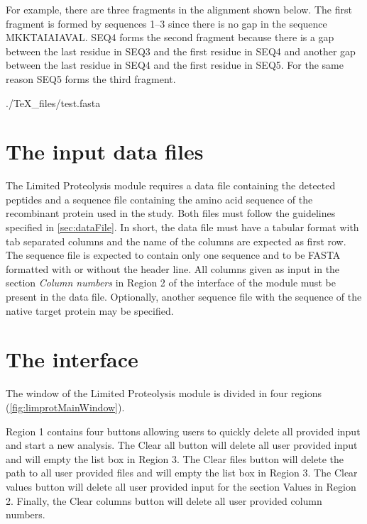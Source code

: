 For example, there are three fragments in the alignment shown below. The first fragment is formed by sequences \numrange{1}{3} since there is no gap in the sequence MKKTAIAIAVAL. SEQ\num{4} forms the second fragment because there is a gap between the last residue in SEQ\num{3} and the first residue in SEQ\num{4} and another gap between the last residue in SEQ\num{4} and the first residue in SEQ\num{5}. For the same reason SEQ\num{5} forms the third fragment.

\begin{texshade}{./TeX_files/test.fasta}
	\hideconsensus
\end{texshade}

\section{The input data files}

The Limited Proteolysis module requires a data file containing the detected peptides and a sequence file containing the amino acid sequence of the recombinant protein used in the study. Both files must follow the guidelines specified in \autoref{sec:dataFile}. In short, the data file must have a tabular format with tab separated columns and the name of the columns are expected as first row. The sequence file is expected to contain only one sequence and to be FASTA formatted with or without the header line. All columns given as input in the section \textit{Column numbers} in Region \num{2} of the interface of the module must be present in the data file. Optionally, another sequence file with the sequence of the native target protein may be specified.

\section{The interface}

The window of the Limited Proteolysis module is divided in four regions (\autoref{fig:limprotMainWindow}). 

Region \num{1} contains four buttons allowing users to quickly delete all provided input and start a new analysis. The Clear all button will delete all user provided input and will empty the list box in Region \num{3}. The Clear files button will delete the path to all user provided files and will empty the list box in Region \num{3}. The Clear values button will delete all user provided input for the section Values in Region \num{2}. Finally, the Clear columns button will delete all user provided column numbers. 

